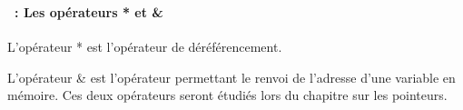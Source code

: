 \begin{frame}
  \frametitle{\secname}
  \framesubtitle{\subsecname~: Les opérateurs * et \&} 
  
  L'opérateur * est l'opérateur de déréférencement.
  \vspace{0.5cm}
  \par
  L'opérateur \& est l'opérateur permettant le renvoi de l'adresse d'une variable en mémoire. Ces deux opérateurs seront
  étudiés lors du chapitre sur les pointeurs.
\end{frame}

